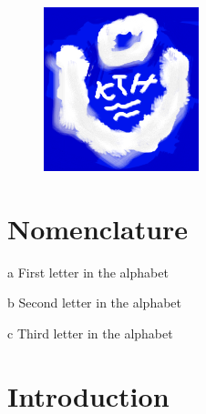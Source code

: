 \documentclass[12pt,twoside]{article}
\begin{document}
\begin{figure}
    \centering
    \includegraphics{KTH.png}
    \caption*{}
\end{figure}

\maketitle
{}

\begin{abstract}
\end{abstract}
\clearpage

\tableofcontents
\clearpage

\listoffigures
\listoftables
\section*{Nomenclature}
\begin{basedescript}{\desclabelstyle{\pushlabel}\desclabelwidth{10em}}
\item[a]                    First letter in the alphabet
\item[b]                    Second letter in the alphabet
\item[c]                    Third letter in the alphabet
\end{basedescript}
\clearpage

\section{Introduction}
\label{section:Introduction}
\end{document}
